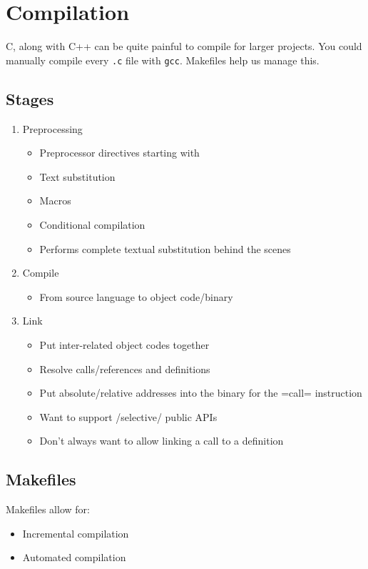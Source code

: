 \section{Compilation}\label{sec:Compilation}
C, along with C++ can be quite painful to compile for larger projects.
You could manually compile every \texttt{.c} file with \texttt{gcc}.
Makefiles help us manage this.

\subsection{Stages}\label{subsec:Compilation_Stages}
\begin{enumerate}[noitemsep]
\item Preprocessing
  \begin{itemize}[noitemsep]
  \item Preprocessor directives starting with \cinline{#}
  \item Text substitution
  \item Macros
  \item Conditional compilation
  \item Performs complete textual substitution behind the scenes
  \end{itemize}
\item Compile
  \begin{itemize}[noitemsep]
  \item From source language to object code/binary
  \end{itemize}
\item Link
  \begin{itemize}[noitemsep]
  \item Put inter-related object codes together
  \item Resolve calls/references and definitions
  \item Put absolute/relative addresses into the binary for the =call= instruction
  \item Want to support /selective/ public APIs
  \item Don't always want to allow linking a call to a definition
  \end{itemize}
\end{enumerate}

\subsection{Makefiles}\label{subsec:Makefiles}
Makefiles allow for:
\begin{itemize}[noitemsep]
\item Incremental compilation
\item Automated compilation
\end{itemize}

